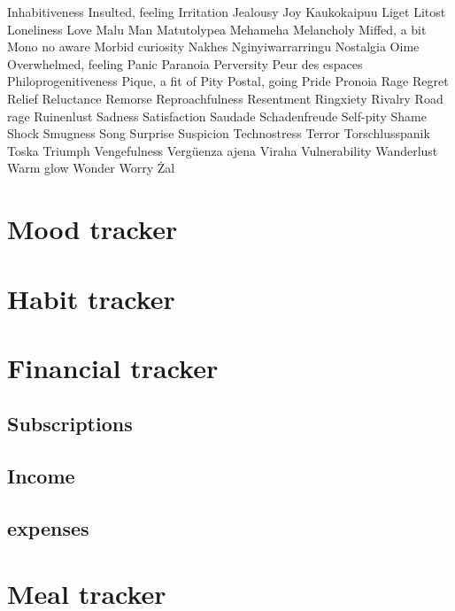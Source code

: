 \documentclass[a4paper]{article}
\begin{document}
	 Inhabitiveness
	 Insulted, feeling
	 Irritation
	 Jealousy
	 Joy
	 Kaukokaipuu
	 Liget
	 Litost
	 Loneliness
	 Love
	 Malu
	 Man
	 Matutolypea
	 Mehameha
	 Melancholy
	 Miffed, a bit
	 Mono no aware
	 Morbid curiosity
	 Nakhes
	 Nginyiwarrarringu
	 Nostalgia
	 Oime
	 Overwhelmed, feeling
	 Panic
	 Paranoia
	 Perversity
	 Peur des espaces
	 Philoprogenitiveness
	 Pique, a fit of
	 Pity
	 Postal, going
	 Pride
	 Pronoia
	 Rage
	 Regret
	 Relief
	 Reluctance
	 Remorse
	 Reproachfulness
	 Resentment
	 Ringxiety
	 Rivalry
	 Road rage
	 Ruinenlust
	 Sadness
	 Satisfaction
	 Saudade
	 Schadenfreude
   Self-pity
	 Shame
	 Shock
	 Smugness
	 Song
	 Surprise
	 Suspicion
	 Technostress
	 Terror
	 Torschlusspanik
	 Toska
	 Triumph
	 Vengefulness
	 Vergüenza ajena
	 Viraha
	 Vulnerability
	 Wanderlust
 	 Warm glow
	 Wonder
	 Worry
	 Żal
\newpage
\section{Mood tracker}
\newpage
\section{Habit tracker}
\newpage
\section{Financial tracker}
\subsection{Subscriptions}
\subsection{Income}
\subsection{expenses}
\newpage
\section{Meal tracker}
\end{document}
